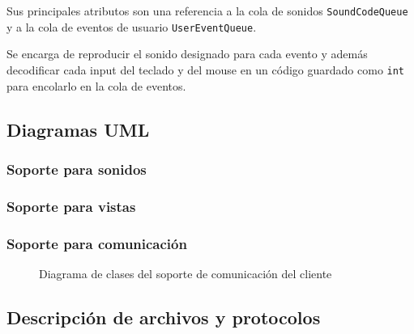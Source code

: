 \documentclass[a4paper]{article}
\begin{document}
Sus principales atributos son una referencia a la cola de sonidos \texttt{SoundCodeQueue} y a la cola de eventos de usuario \texttt{UserEventQueue}.

Se encarga de reproducir el sonido designado para cada evento y además decodificar cada input del teclado y del mouse en un código guardado como \texttt{int} para encolarlo en la cola de eventos.

\subsection{Diagramas UML}

\subsubsection{Soporte para sonidos}

\subsubsection{Soporte para vistas}

\subsubsection{Soporte para comunicación}

\begin{figure}[!h]
	\caption{Diagrama de clases del soporte de comunicación del cliente}
	\label{fig:diagram6}
\end{figure}

\subsection{Descripción de archivos y protocolos}
\end{document}
